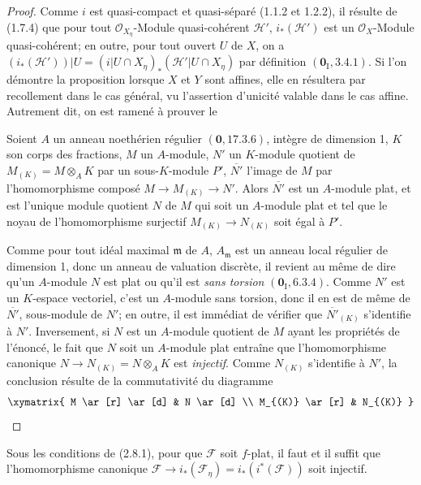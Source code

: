 \begin{proof}
Comme $i$ est quasi-compact et quasi-séparé (1.1.2 et 1.2.2), il résulte de
(1.7.4) que pour tout $\mathcal O_{X_\eta}$-Module quasi-cohérent
$\mathcal H'$, $i_*(\mathcal H')$ est un $\mathcal O_X$-Module
quasi-cohérent; en outre, pour tout ouvert $U$ de $X$, on a
$(i_*(\mathcal H'))|U=(i|U\cap X_\eta)_*(\mathcal H'|U\cap X_\eta)$
par définition $(\mathbf{0}_{\mathrm I},3.4.1)$. Si l'on démontre la proposition
lorsque $X$ et $Y$ sont affines, elle en résultera par recollement dans le cas
général, vu l'assertion d'unicité valable dans le cas affine. Autrement dit,
on est ramené à prouver le

\begin{lemma}[2.8.1.1]
\label{IV.2.8.1.1-fr}
Soient $A$ un anneau noethérien régulier $(\mathbf{0},17.3.6)$, intègre de dimension
1, $K$ son corps des fractions, $M$ un $A$-module, $N'$ un $K$-module
quotient de $M_{(K)}=M\otimes_A K$ par un sous-$K$-module $P'$,
$\overline{N'}$ l'image de $M$ par l'homomorphisme composé
$M\to M_{(K)}\to N'$. Alors $\overline{N'}$ est un $A$-module plat, et est
l'unique module quotient $N$ de $M$ qui soit un $A$-module plat et tel que le
noyau de l'homomorphisme surjectif $M_{(K)}\to N_{(K)}$ soit égal à $P'$.
\end{lemma}

Comme pour tout idéal maximal $\mathfrak m$ de $A$, $A_{\mathfrak m}$ est un
anneau local régulier de dimension 1, donc un anneau de valuation discrète,
il revient au même de dire qu'un $A$-module $N$ est plat ou qu'il est
\emph{sans torsion} $(\mathbf{0}_{\mathrm I},6.3.4)$. Comme $N'$ est un $K$-espace
vectoriel, c'est un $A$-module sans torsion, donc il en est de même de
$\overline{N'}$, sous-module de $N'$; en outre, il est immédiat de vérifier
que $\overline{N'}_{(K)}$ s'identifie à $N'$. Inversement, si $N$ est un
$A$-module quotient de $M$ ayant les propriétés de l'énoncé, le fait que $N$
soit un $A$-module plat entraîne que l'homomorphisme canonique
$N\to N_{(K)}=N\otimes_A K$ est \emph{injectif}. Comme $N_{(K)}$ s'identifie à
$N'$, la conclusion résulte de la commutativité du diagramme
\[
\xymatrix{
M \ar[r] \ar[d] & N \ar[d] \\
M_{(K)} \ar[r] & N_{(K)}
}
\]
\end{proof}

\begin{corollary}[2.8.2]
\label{IV.2.8.2-fr}
Sous les conditions de \textup{(2.8.1)}, pour que $\mathcal F$ soit $f$-plat, il faut
et il suffit que l'homomorphisme canonique
$\mathcal F\to i_*(\mathcal F_\eta)=i_*(i^*(\mathcal F))$
soit injectif.
\end{corollary}

